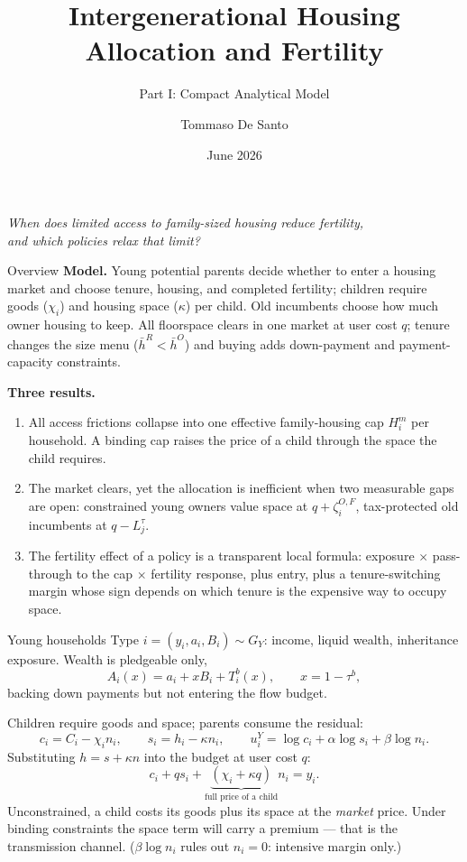 \documentclass[11pt,aspectratio=169]{beamer}
\title{Intergenerational Housing Allocation and Fertility}
\subtitle{Part I: Compact Analytical Model}
\author{Tommaso De Santo}
\date{June 2026}
\newcommand{\1}{\mathbf 1}
\begin{document}
\begin{frame}
\titlepage
\vspace{-1.2em}
\begin{center}
\small
\textit{When does limited access to family-sized housing reduce fertility,\\ and which policies relax that limit?}
\end{center}
\end{frame}

\begin{frame}{Overview}
\small
\textbf{Model.} Young potential parents decide whether to enter a housing market and choose tenure, housing, and completed fertility; children require goods ($\chi_i$) and housing space ($\kappa$) per child. Old incumbents choose how much owner housing to keep. All floorspace clears in one market at user cost $q$; tenure changes the size menu ($\bar h^R<\bar h^O$) and buying adds down-payment and payment-capacity constraints.

\medskip
\textbf{Three results.}
\begin{enumerate}\setlength{\itemsep}{0.45em}
  \item All access frictions collapse into one effective family-housing cap $H_i^m$ per household. A binding cap raises the price of a child through the space the child requires.
  \item The market clears, yet the allocation is inefficient when two measurable gaps are open: constrained young owners value space at $q+\zeta_i^{O,F}$, tax-protected old incumbents at $q-L_j^\tau$.
  \item The fertility effect of a policy is a transparent local formula: exposure $\times$ pass-through to the cap $\times$ fertility response, plus entry, plus a tenure-switching margin whose sign depends on which tenure is the expensive way to occupy space.
\end{enumerate}
\end{frame}

\begin{frame}{Young households}
\small
Type $i=(y_i,a_i,B_i)\sim G_Y$: income, liquid wealth, inheritance exposure. Wealth is pledgeable only,
\[
A_i(x)=a_i+xB_i+T_i^b(x),
\qquad x=1-\tau^b,
\]
backing down payments but not entering the flow budget.

\medskip
Children require goods and space; parents consume the residual:
\[
c_i=C_i-\chi_i n_i,
\qquad
s_i=h_i-\kappa n_i,
\qquad
u_i^Y=\log c_i+\alpha\log s_i+\beta\log n_i .
\]
Substituting $h=s+\kappa n$ into the budget at user cost $q$:
\[
c_i+q s_i+\underbrace{(\chi_i+\kappa q)}_{\text{full price of a child}}n_i=y_i .
\]
\smallskip
Unconstrained, a child costs its goods plus its space at the \emph{market} price. Under binding constraints the space term will carry a premium --- that is the transmission channel. ($\beta\log n_i$ rules out $n_i=0$: intensive margin only.)
\end{frame}
\end{document}
